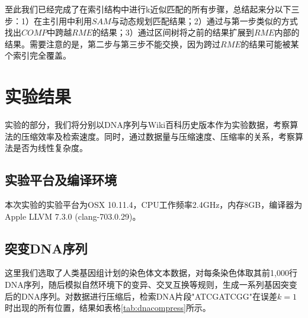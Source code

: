 ﻿\documentclass{sysuthesis}
\begin{document}
至此我们已经完成了在索引结构中进行k近似匹配的所有步骤，总结起来分以下三步：1）在主引用中利用$SAM$与动态规划匹配结果；2）通过与第一步类似的方式找出$COMP$中跨越$RME$的结果；3）通过区间树将之前的结果扩展到$RME$内部的结果。需要注意的是，第二步与第三步不能交换，因为跨过$RME$的结果可能被某个索引完全覆盖。



\chapter{实验结果}
实验的部分，我们将分别以DNA序列与Wiki百科历史版本作为实验数据，考察算法的压缩效率及检索速度。同时，通过数据量与压缩速度、压缩率的关系，考察算法是否为线性复杂度。



\section{实验平台及编译环境}
本次实验的实验平台为OSX 10.11.4，CPU工作频率2.4GHz，内存8GB，编译器为Apple LLVM 7.3.0 (clang-703.0.29)。



\section{突变DNA序列}
这里我们选取了人类基因组计划的染色体文本数据，对每条染色体取其前1,000行DNA序列，随后模拟自然环境下的变异、交叉互换等规则，生成一系列基因突变后的DNA序列。对数据进行压缩后，检索DNA片段"ATCGATCGG"在误差$k = 1$时出现的所有位置，结果如表格\ref{tab:dnacompress}所示。\par
\end{document}
